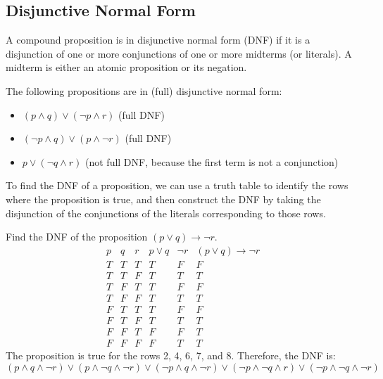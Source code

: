 \subsection{Disjunctive Normal Form}
\begin{definition}
    A compound proposition is in disjunctive normal form (DNF) if it is a disjunction of one or more conjunctions of one or more midterms (or literals). A midterm is either an atomic proposition or its negation.
\end{definition}
\begin{eg}
    The following propositions are in (full) disjunctive normal form:
    \begin{itemize}[itemsep=1pt,label=$\circ$]
        \item \((p \land q) \lor (\neg p \land r)\) (full DNF)
        \item \((\neg p \land q) \lor (p \land \neg r)\) (full DNF)
        \item \(p \lor (\neg q \land r)\) (not full DNF, because the first term is not a conjunction)
    \end{itemize}
\end{eg}
To find the DNF of a proposition, we can use a truth table to identify the rows where the proposition is true, and then construct the DNF by taking the disjunction of the conjunctions of the literals corresponding to those rows.
\begin{eg}
    Find the DNF of the proposition $(p \lor q) \to \neg r$.
    \[
        \begin{array}{c|c|c|c|c|c}
            p & q & r & p \lor q & \neg r & (p \lor q) \to \neg r \\
            \hline
            T & T & T & T & F & F \\
            T & T & F & T & T & T \\
            T & F & T & T & F & F \\
            T & F & F & T & T & T \\
            F & T & T & T & F & F \\
            F & T & F & T & T & T \\
            F & F & T & F & F & T \\
            F & F & F & F & T & T
        \end{array}
    \]
    The proposition is true for the rows 2, 4, 6, 7, and 8. Therefore, the DNF is:
    \[ (p \land q \land \neg r) \lor (p \land \neg q \land \neg r) \lor (\neg p \land q \land \neg r) \lor (\neg p \land \neg q \land r) \lor (\neg p \land \neg q \land \neg r) \]
\end{eg}


